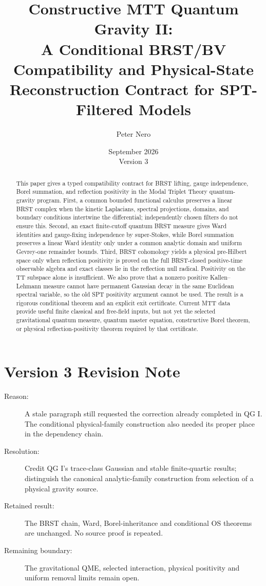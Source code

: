 \documentclass[11pt]{article}
\title{Constructive MTT Quantum Gravity II:\\
\large A Conditional BRST/BV Compatibility and Physical-State Reconstruction Contract for SPT-Filtered Models}
\author{Peter Nero}
\date{September 2026\\Version 3}
\begin{document}
\maketitle

\begin{abstract}
This paper gives a typed compatibility contract for BRST lifting, gauge
independence, Borel summation, and reflection positivity in the Modal Triplet
Theory quantum-gravity program. First, a common bounded functional
calculus preserves a linear BRST complex when the kinetic Laplacians, spectral
projections, domains, and boundary conditions intertwine the differential;
independently chosen filters do not ensure this.  Second, an exact
finite-cutoff quantum BRST measure gives Ward identities and gauge-fixing
independence by super-Stokes, while Borel summation preserves a linear Ward
identity only under a common analytic domain and uniform Gevrey-one remainder
bounds.  Third, BRST cohomology yields a physical pre-Hilbert space only when
reflection positivity is proved on the full BRST-closed positive-time
observable algebra and exact classes lie in the reflection null radical.
Positivity on the TT subspace alone is insufficient.  We also prove that a
nonzero positive Kallen--Lehmann measure cannot have permanent Gaussian decay
in the same Euclidean spectral variable, so the old SPT positivity argument
cannot be used.  The result is a rigorous conditional theorem and an explicit
exit certificate.  Current MTT data provide useful finite classical and
free-field inputs, but not yet the selected gravitational quantum measure,
quantum master equation, constructive Borel theorem, or physical
reflection-positivity theorem required by that certificate.
\end{abstract}

\section*{Version 3 Revision Note}
\begin{description}
\item[Reason:] A stale paragraph still requested the correction already completed
in QG I. The conditional physical-family construction also needed its proper
place in the dependency chain.
\item[Resolution:] Credit QG I's trace-class Gaussian and stable finite-quartic
results; distinguish the canonical analytic-family construction from selection
of a physical gravity source.
\item[Retained result:] The BRST chain, Ward, Borel-inheritance and conditional
OS theorems are unchanged. No source proof is repeated.
\item[Remaining boundary:] The gravitational QME, selected interaction,
physical positivity and uniform removal limits remain open.
\end{description}
\end{document}
